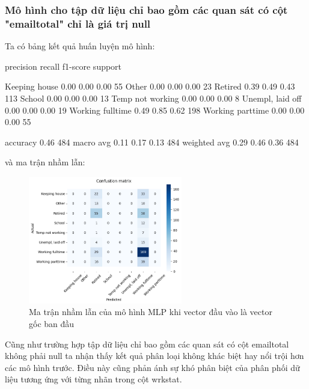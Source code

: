 \subsubsection{Mô hình cho tập dữ liệu chỉ bao gồm các quan sát có cột "emailtotal" chỉ là giá trị null}

Ta có bảng kết quả huấn luyện mô hình:

\begin{python}
    precision    recall  f1-score   support

   Keeping house       0.00      0.00      0.00        55
           Other       0.00      0.00      0.00        23
         Retired       0.39      0.49      0.43       113
          School       0.00      0.00      0.00        13
Temp not working       0.00      0.00      0.00         8
Unempl, laid off       0.00      0.00      0.00        19
Working fulltime       0.49      0.85      0.62       198
Working parttime       0.00      0.00      0.00        55

        accuracy                           0.46       484
       macro avg       0.11      0.17      0.13       484
    weighted avg       0.29      0.46      0.36       484
\end{python}

và ma trận nhầm lẫn:

\begin{figure}[H]
    \centering
    \includegraphics[width=0.6\textwidth]{figures/Thanh/Models/MLP_Deep_Learning/With_null_models_confusion_matrix_MLP_original_features.png}
    \caption{Ma trận nhầm lẫn của mô hình MLP khi vector đầu vào là vector gốc ban đầu}
    \label{fig:With_null_models_confusion_matrix_MLP_original_features}
\end{figure}

Cũng như trường hợp tập dữ liệu chỉ bao gồm các quan sát có cột emailtotal không phải null ta nhận thấy kết quả phân loại không khác biệt hay nổi trội hơn các mô hình trước.
Điều này cũng phản ánh sự khó phân biệt của phân phối dữ liệu tương ứng với từng nhãn trong cột wrkstat.
